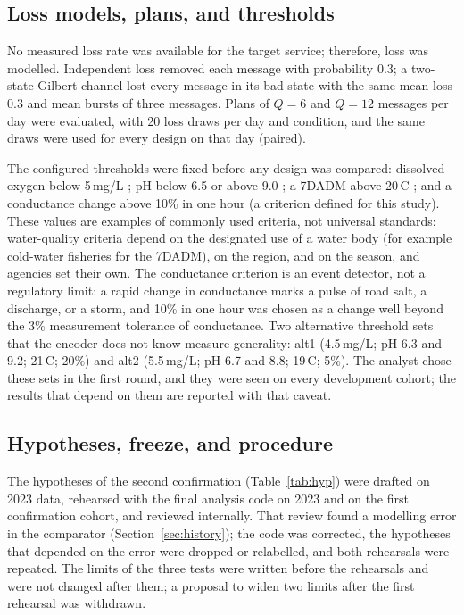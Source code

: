 \subsection{Loss models, plans, and thresholds}
\label{sec:channels}
No measured loss rate was available for the target service; therefore, loss was modelled. Independent loss removed each message with probability 0.3; a two-state Gilbert channel \citep{gilbert1960,elliott1963} lost every message in its bad state with the same mean loss 0.3 and mean bursts of three messages. Plans of $Q = 6$ and $Q = 12$ messages per day were evaluated, with 20 loss draws per day and condition, and the same draws were used for every design on that day (paired).

The configured thresholds were fixed before any design was compared: dissolved oxygen below 5\,mg/L \citep{epa1986do}; pH below 6.5 or above 9.0 \citep{epa1986gold}; a 7DADM above 20\,\textdegree C \citep{epa2003temp}; and a conductance change above 10\% in one hour (a criterion defined for this study). These values are examples of commonly used criteria, not universal standards: water-quality criteria depend on the designated use of a water body (for example cold-water fisheries for the 7DADM), on the region, and on the season, and agencies set their own. The conductance criterion is an event detector, not a regulatory limit: a rapid change in conductance marks a pulse of road salt, a discharge, or a storm, and 10\% in one hour was chosen as a change well beyond the 3\% measurement tolerance of conductance. Two alternative threshold sets that the encoder does not know measure generality: alt1 (4.5\,mg/L; pH 6.3 and 9.2; 21\,\textdegree C; 20\%) and alt2 (5.5\,mg/L; pH 6.7 and 8.8; 19\,\textdegree C; 5\%). The analyst chose these sets in the first round, and they were seen on every development cohort; the results that depend on them are reported with that caveat.

\subsection{Hypotheses, freeze, and procedure}
\label{sec:procedure}
The hypotheses of the second confirmation (Table~\ref{tab:hyp}) were drafted on 2023 data, rehearsed with the final analysis code on 2023 and on the first confirmation cohort, and reviewed internally. That review found a modelling error in the comparator (Section~\ref{sec:history}); the code was corrected, the hypotheses that depended on the error were dropped or relabelled, and both rehearsals were repeated. The limits of the three tests were written before the rehearsals and were not changed after them; a proposal to widen two limits after the first rehearsal was withdrawn.

